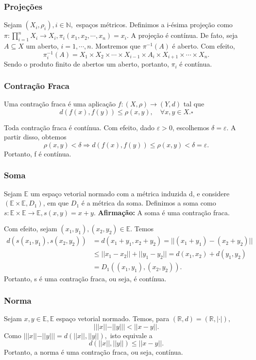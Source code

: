 \documentclass[MetricSpaces/metric_notes.tex]{subfiles}
\begin{document}
\subsubsection{Projeções}
Sejam \((X_{i}, \rho_{i}), i\in \mathbb{N},\) espaços métricos. Definimos a i-ésima projeção como
\(\pi :\prod\limits_{i=1}^{n}X_{i}\rightarrow X_{i}, \pi_{i}(x_1, x_2, \cdots, x_{n}) = x_{i}.\) A projeção
é contínua. De fato, seja \(A\subseteq{X}\) um aberto, \(i=1, \cdots, n.\) Mostremos que \(\pi^{-1}(A)\) é aberto.
Com efeito,
\[
	\pi_{i}^{-1}(A) = X_{1}\times X_{2}\times \cdots\times X_{i-1}\times A_{i}\times X_{i+1}\times \cdots\times X_{n}.
\]
Sendo o produto finito de abertos um aberto, portanto, \(\pi_{i}\) é contínua.
\subsubsection{Contração Fraca}
\begin{def*}
	Uma contração fraca é uma aplicação \(f:(X, \rho )\rightarrow (Y, d)\) tal que
	\[
		d(f(x), f(y))\leq \rho(x, y),\quad \forall x,y \in X.\square
	\]
\end{def*}
Toda contração fraca é contínua. Com efeito, dado \(\varepsilon > 0\), escolhemos \(\delta = \varepsilon\). A partir
disso, obtemos
\[
	\rho (x, y) < \delta \Rightarrow d(f(x), f(y))\leq \rho (x, y) < \delta =\varepsilon .
\]
Portanto, f é contínua.
\subsubsection{Soma}
Sejam \(\mathbb{E}\) um espaço vetorial normado com a métrica induzida d, e considere
\((\mathbb{E}\times \mathbb{E}, D_{1})\), em que \(D_{1}\) é a métrica da soma. Definimos a soma como
\(s:\mathbb{E}\times \mathbb{E}\rightarrow \mathbb{E}, s(x, y) = x + y.\)
\textbf{Afirmação:} A soma é uma contração fraca.

Com efeito, sejam \((x_{1}, y_{1}), (x_{2}, y_{2})\in \mathbb{E}.\) Temos
\begin{align*}
	d(s(x_{1}, y_{1}), s(x_{2}, y_{2})) & = d(x_{1}+y_{1}, x_{2}+y_{2}) = ||(x_{1}+y_{1})-(x_{2}+y_{2})||            \\
	                                    & \leq ||x_{1}-x_{2}|| + ||y_{1}-y_{2}|| = d(x_{1}, x_{2}) + d(y_{1}, y_{2}) \\
	                                    & =D_{1}((x_{1}, y_{1}), (x_{2}, y_{2})).
\end{align*}
Portanto, s é uma contração fraca, ou seja, é contínua.
\subsubsection{Norma}
Sejam \(x, y\in \mathbb{E}, \mathbb{E}\) espaço vetorial normado. Temos, para \((\mathbb{R}, d)=(\mathbb{R}, |\cdot |),\)
\[
	|||x||-||y||| < ||x-y||.
\]
Como \(|||x||-||y||| = d(||x||, ||y||),\) isto equivale a
\[
	d(||x||, ||y||)\leq ||x-y||.
\]
Portanto, a norma é uma contração fraca, ou seja, contínua.
\end{document}
